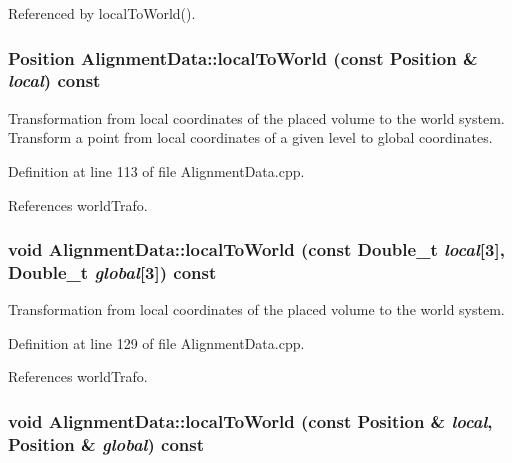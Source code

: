 Referenced by localToWorld().\hypertarget{class_d_d4hep_1_1_alignments_1_1_alignment_data_abd5ea2c3e08f510fb326a97eb3ec16bd}{
\subsubsection[{localToWorld}]{\setlength{\rightskip}{0pt plus 5cm}Position AlignmentData::localToWorld (const Position \& {\em local}) const}}
\label{class_d_d4hep_1_1_alignments_1_1_alignment_data_abd5ea2c3e08f510fb326a97eb3ec16bd}


Transformation from local coordinates of the placed volume to the world system. Transform a point from local coordinates of a given level to global coordinates. 

Definition at line 113 of file AlignmentData.cpp.

References worldTrafo.\hypertarget{class_d_d4hep_1_1_alignments_1_1_alignment_data_ae0c2e7c631c7af81c54a4f75317120aa}{
\subsubsection[{localToWorld}]{\setlength{\rightskip}{0pt plus 5cm}void AlignmentData::localToWorld (const Double\_\-t {\em local}\mbox{[}3\mbox{]}, \/  Double\_\-t {\em global}\mbox{[}3\mbox{]}) const}}
\label{class_d_d4hep_1_1_alignments_1_1_alignment_data_ae0c2e7c631c7af81c54a4f75317120aa}


Transformation from local coordinates of the placed volume to the world system. 

Definition at line 129 of file AlignmentData.cpp.

References worldTrafo.\hypertarget{class_d_d4hep_1_1_alignments_1_1_alignment_data_a84abb7a2397faef2d62cb1378f14e087}{
\subsubsection[{localToWorld}]{\setlength{\rightskip}{0pt plus 5cm}void AlignmentData::localToWorld (const Position \& {\em local}, \/  Position \& {\em global}) const}}
\label{class_d_d4hep_1_1_alignments_1_1_alignment_data_a84abb7a2397faef2d62cb1378f14e087}


